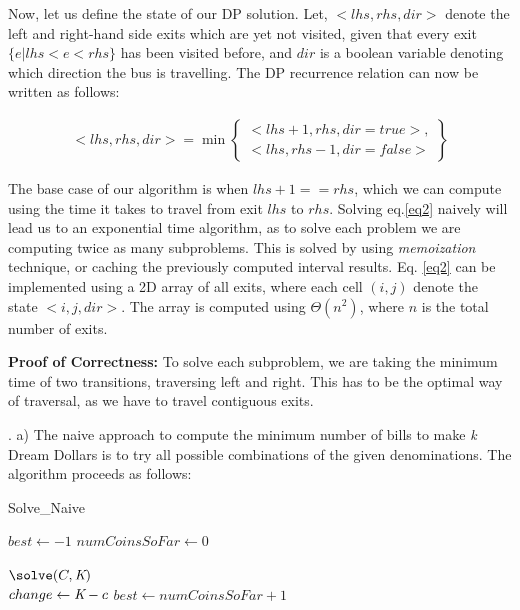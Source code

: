 \documentclass[assign]{article}
\begin{document}
\noindent Now, let us define the state of our DP solution. Let, $<lhs, rhs, dir>$ denote the left and right-hand side exits which are yet not visited, given that every exit $\{ e | lhs < e < rhs\}$ has been visited before, and $dir$ is a boolean variable denoting which direction the bus is travelling. The DP recurrence relation can now be written as follows:

\vspace{-10pt}
\begin{eqnarray}
   <lhs, rhs, dir> = \min\left\{ \begin{array} {cc}
        <lhs + 1, rhs, dir = true>, \\
        <lhs, rhs - 1, dir = false>
 \end{array} \right\}  
\label{eq2}
\end{eqnarray}

\noindent The base case of our algorithm is when $lhs + 1 == rhs$, which we can compute using the time it takes to travel from exit $lhs$ to $rhs$. Solving eq.\ref{eq2} naively will lead us to an exponential time algorithm, as to solve each problem we are computing twice as many subproblems. This is solved by using {\em memoization} technique, or caching the previously computed interval results. Eq. \ref{eq2} can be implemented using a 2D array of all exits, where each cell $(i,j)$ denote the state $<i,j,dir>$. The array is computed using $\Theta (n^2)$, where $n$ is the total number of exits. 

\noindent \textbf{Proof of Correctness:} To solve each subproblem, we are taking the minimum time of two transitions, traversing left and right. This has to be the optimal way of traversal, as we have to travel contiguous exits.  

\vspace{10pt}

. a) The naive approach to compute the minimum number of bills to make {\emph k} Dream Dollars is to try all possible combinations of the given denominations. The algorithm proceeds as follows:

\begin{algorithm}[H]
 \caption{Solve\_Naive}
 $best \gets -1$\; 
 $numCoinsSoFar \gets 0$\;
 
 $\solve(C, {\emph K} )$ { \\
  {
    $change \gets {\emph K} - c$\; 
     {
        {
          $best \gets numCoinsSoFar + 1$\;
       } 
    }
  }
  }
  \label{algo1}
\end{algorithm}
\end{document}
